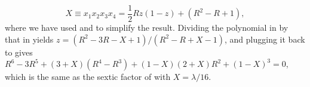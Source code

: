 \documentclass{ws-ijbc}
\begin{document}
%
\begin{equation}
  X \equiv x_1 x_2 x_3 x_4 = \frac{1}{2} R z(1 - z) + (R^2 - R + 1),
\label{eq:der4}
\end{equation}
where we have used  and  to simplify the result.
%
Dividing the polynomial in  by that in 
yields $z = (R^2-3R-X+1)/(R^2-R+X-1)$,
and plugging it back to  gives
   $R^6 -3 R^5
  + (3 + X) (R^4 - R^3)
  + (1 - X) (2 + X) R^2
  + (1 - X)^3 = 0$,
which is the same as the sextic factor of 
  with $X = \lambda/16$.










\end{document}
